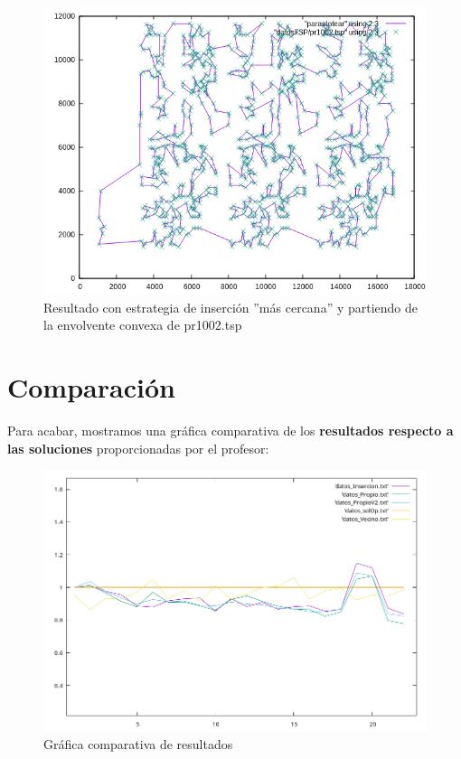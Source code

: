 \documentclass{article}
\begin{document}
\begin{figure}[H]
	\centering
	\includegraphics[totalheight=8cm]{img/convex_second}
	\caption{Resultado con estrategia de inserción ''más cercana'' y partiendo de la envolvente convexa de pr1002.tsp}
	\label{fig:convex_second}
	\end{figure}	


\section{Comparación}
Para acabar, mostramos una gráfica comparativa de los \textbf{resultados respecto a las soluciones} proporcionadas por el profesor:
\begin{figure}[H]
	\centering
	\includegraphics[totalheight=6cm]{img/comparativa}
	\caption{Gráfica comparativa de resultados}
	\label{fig:comparativa}
\end{figure}
\end{document}
